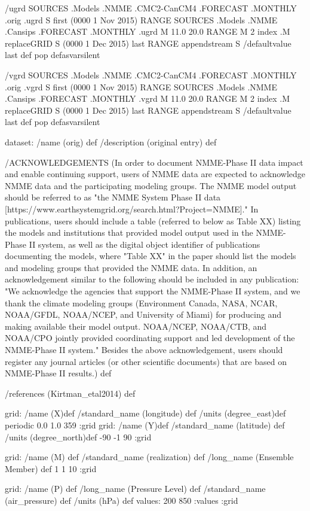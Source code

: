 \begin{ingrid}
/ugrd {
 SOURCES .Models .NMME .CMC2-CanCM4 .FORECAST .MONTHLY .orig .ugrd 
S first (0000 1 Nov 2015) RANGE
 SOURCES .Models .NMME .Cansips .FORECAST .MONTHLY .ugrd
 M 11.0 20.0 RANGE
 M 2 index .M replaceGRID
S (0000 1 Dec 2015) last RANGE
appendstream
S /defaultvalue last def pop
} defasvarsilent

/vgrd {
 SOURCES .Models .NMME .CMC2-CanCM4 .FORECAST .MONTHLY .orig .vgrd 
S first (0000 1 Nov 2015) RANGE
 SOURCES .Models .NMME .Cansips .FORECAST .MONTHLY .vgrd
 M 11.0 20.0 RANGE
 M 2 index .M replaceGRID
S (0000 1 Dec 2015) last RANGE
appendstream
S /defaultvalue last def pop
} defasvarsilent


dataset:
/name (orig) def
/description (original entry) def

/ACKNOWLEDGEMENTS (In order to document NMME-Phase II data impact and enable continuing support, users of NMME data are expected to acknowledge NMME data and the participating modeling groups. The NMME model output should be referred to as "the NMME System Phase II data [https://www.earthsystemgrid.org/search.html?Project=NMME]."  In publications, users should include a table (referred to below as Table XX) listing the models and institutions that provided model output used in the NMME-Phase II system, as well as the digital object identifier of publications documenting the models, where "Table XX" in the paper should list the models and modeling groups that provided the NMME data.  In addition, an acknowledgement similar to the following should be included in any publication:  "We acknowledge the agencies that support the NMME-Phase II system, and we thank the climate modeling groups (Environment Canada, NASA, NCAR, NOAA/GFDL, NOAA/NCEP, and University of Miami) for producing and making available their model output. NOAA/NCEP, NOAA/CTB, and NOAA/CPO jointly provided coordinating support and led development of the NMME-Phase II system."  Besides the above acknowledgement, users should register any journal articles (or other scientific documents) that are based on NMME-Phase II results.) def

/references (Kirtman_etal2014) def

grid:
/name (X)def
/standard_name (longitude) def
/units (degree_east)def
periodic
 0.0 1.0 359
:grid
grid:
/name (Y)def
/standard_name (latitude) def
/units (degree_north)def
-90 -1 90
:grid

grid:
/name (M) def
/standard_name (realization) def
/long_name (Ensemble Member) def
1 1 10
:grid

grid:
/name (P) def
/long_name (Pressure Level) def
/standard_name (air_pressure) def
/units (hPa) def
values: 200 850 :values
:grid


\end{ingrid}
